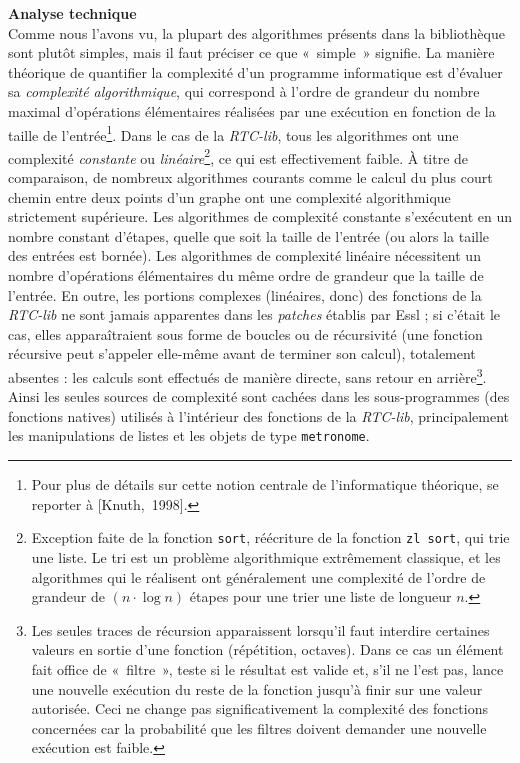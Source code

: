 \documentclass[a4paper,12pt]{article}
\newcommand{\guill}[1]{«~#1~»}
\newcommand{\cicite}[1]{{\footnotesize[#1]}}
\begin{document}
\textbf{Analyse technique} \\
Comme nous l'avons vu, la plupart des algorithmes présents dans la bibliothèque sont plutôt simples, mais il faut préciser ce que \guill{simple} signifie. La manière théorique de quantifier la complexité d'un programme informatique est d'évaluer sa \emph{complexité algorithmique}, qui correspond à l'ordre de grandeur du nombre maximal d'opérations élémentaires réalisées par une exécution en fonction de la taille de l'entrée\footnote{Pour plus de détails sur cette notion centrale de l'informatique théorique, se reporter à \cicite{Knuth,~1998}.}. Dans le cas de la \emph{RTC-lib}, tous les algorithmes ont une complexité \emph{constante} ou \emph{linéaire}\footnote{Exception faite de la fonction \texttt{sort}, réécriture de la fonction \texttt{zl sort}, qui trie une liste. Le tri est un problème algorithmique extrêmement classique, et les algorithmes qui le réalisent ont généralement une complexité de l'ordre de grandeur de $(n\cdot\log n)$ étapes pour une trier une liste de longueur $n$.}, ce qui est effectivement faible. À titre de comparaison, de nombreux algorithmes courants comme le calcul du plus court chemin entre deux points d'un graphe ont une complexité algorithmique strictement supérieure. Les algorithmes de complexité constante s'exécutent en un nombre constant d'étapes, quelle que soit la taille de l'entrée (ou alors la taille des entrées est bornée). Les algorithmes de complexité linéaire nécessitent un nombre d'opérations élémentaires du même ordre de grandeur que la taille de l'entrée. En outre, les portions complexes (linéaires, donc) des fonctions de la \emph{RTC-lib} ne sont jamais apparentes dans les \emph{patches} établis par Essl ; si c'était le cas, elles apparaîtraient sous forme de boucles ou de récursivité (une fonction récursive peut s'appeler elle-même avant de terminer son calcul), totalement absentes : les calculs sont effectués de manière directe, sans retour en arrière\footnote{Les seules traces de récursion apparaissent lorsqu'il faut interdire certaines valeurs en sortie d'une fonction (répétition, octaves). Dans ce cas un élément fait office de \guill{filtre}, teste si le résultat est valide et, s'il ne l'est pas, lance une nouvelle exécution du reste de la fonction jusqu'à finir sur une valeur autorisée. Ceci ne change pas significativement la complexité des fonctions concernées car la probabilité que les filtres doivent demander une nouvelle exécution est faible.}. Ainsi les seules sources de complexité sont cachées dans les sous-programmes (des fonctions natives) utilisés à l'intérieur des fonctions de la \emph{RTC-lib}, principalement les manipulations de listes et les objets de type \texttt{metronome}.
\end{document}
